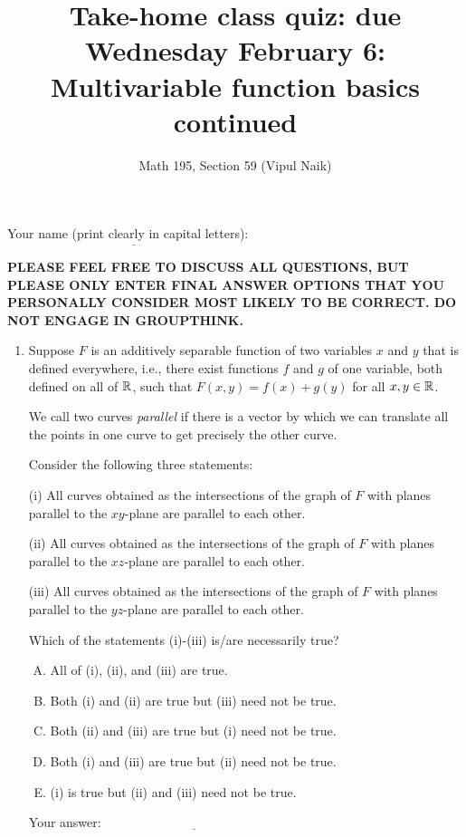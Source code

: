 \documentclass[10pt]{amsart}
\title{Take-home class quiz: due Wednesday February 6: Multivariable function basics continued}
\author{Math 195, Section 59 (Vipul Naik)}
\begin{document}
\maketitle

Your name (print clearly in capital letters): $\underline{\qquad\qquad\qquad\qquad\qquad\qquad\qquad\qquad\qquad\qquad}$

{\bf PLEASE FEEL FREE TO DISCUSS ALL QUESTIONS, BUT PLEASE ONLY ENTER
FINAL ANSWER OPTIONS THAT YOU PERSONALLY CONSIDER MOST LIKELY TO BE
CORRECT. DO NOT ENGAGE IN GROUPTHINK.}

\begin{enumerate}
\item Suppose $F$ is an additively separable function of two variables
  $x$ and $y$ that is defined everywhere, i.e., there exist functions
  $f$ and $g$ of one variable, both defined on all of $\mathbb{R}$, such that
  $F(x,y) = f(x) + g(y)$ for all $x,y \in \mathbb{R}$.
 
  We call two curves {\em parallel} if there is a vector by which we
  can translate all the points in one curve to get precisely the other
  curve.

  Consider the following three statements:

  (i) All curves obtained as the intersections of the graph of $F$
  with planes parallel to the $xy$-plane are parallel to each other.

  (ii) All curves obtained as the intersections of the graph of $F$
  with planes parallel to the $xz$-plane are parallel to each other.

  (iii) All curves obtained as the intersections of the graph of $F$
  with planes parallel to the $yz$-plane are parallel to each other.

  Which of the statements (i)-(iii) is/are necessarily true?

  \begin{enumerate}[(A)]
  \item All of (i), (ii), and (iii) are true.
  \item Both (i) and (ii) are true but (iii) need not be true.
  \item Both (ii) and (iii) are true but (i) need not be true.
  \item Both (i) and (iii) are true but (ii) need not be true.
  \item (i) is true but (ii) and (iii) need not be true.
  \end{enumerate}

  \vspace{0.1in}
  Your answer: $\underline{\qquad\qquad\qquad\qquad\qquad\qquad\qquad}$
  \vspace{0.1in}


\end{enumerate}
\end{document}
